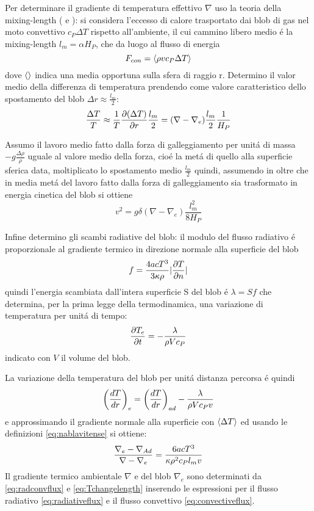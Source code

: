 \documentclass[../main.tex]{subfiles}
\begin{document}
Per determinare il gradiente di temperatura effettivo $\nabla$ uso la teoria della mixing-length (\cite{prandtl25tur} e \cite{vitense53kon}):
si considera l'eccesso di calore trasportato dai blob di gas nel moto convettivo $c_P\Delta T$ rispetto all'ambiente, il cui cammino libero medio \'e la mixing-length $l_m=\alpha H_P$, che da luogo al flusso di energia
\begin{equation}
F_{con}=\exv{\rho vc_P\Delta T}\label{eq:convectiveflux}
\end{equation}
dove $\exv{}$ indica una media opportuna sulla sfera di raggio r. Determino il valor medio della differenza di temperatura prendendo come valore caratteristico dello spostamento del blob $\Delta r\approx\frac{l_m}{2}$:
\begin{equation}
\frac{\Delta T}{T}\approx\frac{1}{T}\PDy{r}{(\Delta T)}\frac{l_m}{2}=(\nabla-\nabla_e)\frac{l_m}{2}\frac{1}{H_P}\label{eq:blobambdiff}
\end{equation}

Assumo il lavoro medio fatto dalla forza di galleggiamento per unit\'a di massa $-g\frac{\Delta\rho}{\rho}$ uguale al valore medio della forza, cio\'e la met\'a di quello alla superficie sferica data, moltiplicato lo spostamento medio $\frac{l_m}{2}$ quindi, assumendo in oltre che in media met\'a del lavoro fatto dalla forza di galleggiamento sia trasformato in energia cinetica del blob si ottiene
\begin{equation}
v^2=g\delta(\nabla-\nabla_e)\frac{l_m^2}{8H_P}\label{eq:blobvelocity}
\end{equation}

Infine determino gli scambi radiative del blob: il modulo del flusso radiativo \'e proporzionale al gradiente termico in direzione normale alla superficie del blob
\begin{equation}
f=\frac{4acT^3}{3\kappa\rho}|\PDy{n}{T}|
\end{equation}
quindi l'energia scambiata dall'intera superficie S del blob \'e $\lambda=Sf$ che determina, per la prima legge della termodinamica, una variazione di temperatura per unit\'a di tempo:
\begin{equation}
\PDy{t}{T_e}=-\frac{\lambda}{\rho Vc_P}
\end{equation}
indicato con $V$ il volume del blob.

La variazione della temperatura del blob per unit\'a distanza percorsa \'e quindi
\begin{equation}
\Dcvar{\TDy{r}{T}}{e}=\Dcvar{\TDy{r}{T}}{ad}-\frac{\lambda}{\rho Vc_Pv}\label{eq:Tchangelength}
\end{equation}
e approssimando il gradiente normale alla superficie con $\exv{\Delta T}$ ed usando le definizioni \eqref{eq:nablavitense} si ottiene:
\begin{equation}
\frac{\nabla_e-\nad{}}{\nabla-\nabla_e}=\frac{6acT^3}{\kappa\rho^2c_Pl_mv}
\end{equation}
Il gradiente termico ambientale $\nabla$ e del blob $\nabla_e$ sono determinati da \eqref{eq:radconvflux} e \eqref{eq:Tchangelength} inserendo le espressioni per il flusso radiativo \eqref{eq:radiativeflux} e il flusso convettivo \eqref{eq:convectiveflux}.
\end{document}
